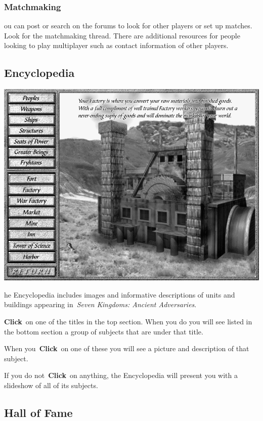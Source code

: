 \subsubsection{Matchmaking} %

ou can post or search on the forums to look for other players or set up matches. Look for the matchmaking thread. There are additional resources for people looking to play multiplayer such as contact information of other players.

\subsection{Encyclopedia}


\begin{center}
	\includegraphics[width=0.9\linewidth]{Iencyclopedia}
\end{center}

he Encyclopedia includes images and informative descriptions of units and buildings appearing in \textit{Seven Kingdoms: Ancient Adversaries}.

\textbf{Click} on one of the titles in the top section. When you do you will see listed in the bottom section a group of subjects that are under that title.

When you \textbf{Click} on one of these you will see a picture and description of that subject.

If you do not \textbf{Click} on anything, the Encyclopedia will present you with a slideshow of all of its subjects.

\subsection{Hall of Fame}

